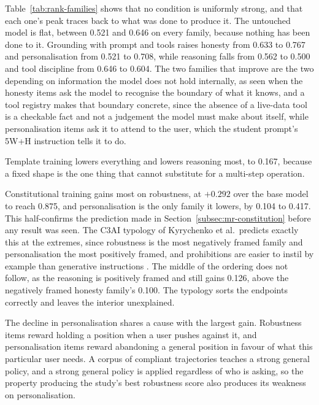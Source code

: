 

Table~\ref{tab:rank-families} shows that no condition is uniformly strong, and that each one's peak traces back to what was done to produce it. The untouched model is flat, between 0.521 and 0.646 on every family, because nothing has been done to it. Grounding with prompt and tools raises honesty from 0.633 to 0.767 and personalisation from 0.521 to 0.708, while reasoning falls from 0.562 to 0.500 and tool discipline from 0.646 to 0.604. The two families that improve are the two depending on information the model does not hold internally, as seen when the honesty items ask the model to recognise the boundary of what it knows, and a tool registry makes that boundary concrete, since the absence of a live-data tool is a checkable fact and not a judgement the model must make about itself, while personalisation items ask it to attend to the user, which the student prompt's 5W+H instruction tells it to do. 

Template training lowers everything and lowers reasoning most, to 0.167, because a fixed shape is the one thing that cannot substitute for a multi-step operation.

Constitutional training gains most on robustness, at $+0.292$ over the base model to reach 0.875, and personalisation is the only family it lowers, by 0.104 to 0.417. This half-confirms the prediction made in Section~\ref{subsec:mr-constitution} before any result was seen. The C3AI typology of Kyrychenko et al.\ predicts exactly this at the extremes, since robustness is the most negatively framed family and personalisation the most positively framed, and prohibitions are easier to instil by example than generative instructions \cite{kyrychenko2025c3aicraftingevaluatingconstitutions}. The middle of the ordering does not follow, as the reasoning is positively framed and still gains 0.126, above the negatively framed honesty family's 0.100. The typology sorts the endpoints correctly and leaves the interior unexplained.

The decline in personalisation shares a cause with the largest gain. Robustness items reward holding a position when a user pushes against it, and personalisation items reward abandoning a general position in favour of what this particular user needs. A corpus of compliant trajectories teaches a strong general policy, and a strong general policy is applied regardless of who is asking, so the property producing the study's best robustness score also produces its weakness on personalisation.

